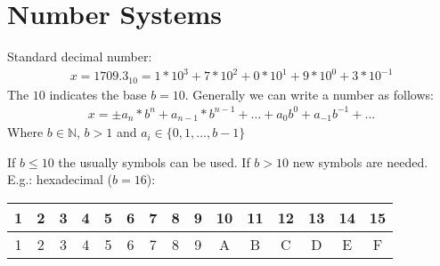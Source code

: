\chapter{Number Systems}\label{ch:number-systems}
Standard decimal number:
\begin{align*}
    x = 1709.3_{10} = 1 * 10^{3} + 7 * 10^2 + 0*10^1+9*10^0+3*10^{-1}
\end{align*}
The $10$ indicates the base $b=10$.
Generally we can write a number as follows:
\begin{align*}
    x =\pm a_n*b^n+a_{n-1}*b^{n-1}+\ldots+a_0b^0+a_{-1}b^{-1}+\ldots
\end{align*}
Where $b \in \mathbb{N}$, $b>1$ and $a_i \in \{0,1, \dots, b-1\}$

If $b \leq 10$ the usually symbols can be used.
If $b>10$ new symbols are needed.
E.g.: hexadecimal ($b=16$):

\begin{center}
    \begin{tabular}{ c | c| c |c| c| c| c| c| c| c| c| c| c| c| c}
        1 & 2 & 3 & 4 & 5 & 6 & 7 & 8 & 9 & 10 & 11 & 12 & 13 & 14 & 15 \\
        \hline
        1 & 2 & 3 & 4 & 5 & 6 & 7 & 8 & 9 & A  & B  & C  & D  & E  & F  \\
    \end{tabular}
\end{center}


